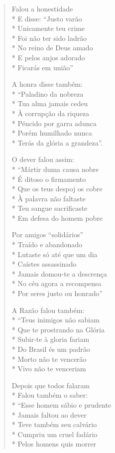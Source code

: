\begin{verse}
Falou a honestidade\\*
E disse: ``Justo varão\\*
Unicamente teu crime\\*
Foi não ter sido ladrão\\*
No reino de Deus amado\\*
E pelos anjos adorado\\*
Ficarás em união''

A honra disse também:\\*
``Paladino da nobreza\\*
Tua alma jamais cedeu\\*
À corrupção da riqueza\\*
Péncido por garra adunca\\*
Porém humilhado nunca\\*
Terás da glória a grandeza''.

O dever falou assim:\\*
``Mártir duma causa nobre\\*
É ditoso o firmamento\\*
Que os teus despoj os cobre\\*
À palavra não faltaste\\*
Teu sangue sacrificaste\\*
Em defesa do homem pobre

Por amigos ``solidários''\\*
Traído e abandonado\\*
Lutaste só até que um dia\\*
Caístes assassinado\\*
Jamais domou-te a descrença\\*
No céu agora a recompensa\\*
Por seres justo ou honrado''

A Razão falou também:\\*
``Teus inimigos não sabiam\\*
Que te prostrando na Glória\\*
Subir-te à gloria fariam\\*
Do Brasil és um padrão\\*
Morto não te vencerão\\*
Vivo não te venceriam

Depois que todos falaram\\*
Falou também o saber:\\*
``Esse homem sábio e prudente\\*
Jamais faltou ao dever\\*
Teve também seu calvário\\*
Cumpriu um cruel fadário\\*
Pelos homens quis morrer


\end{verse}
